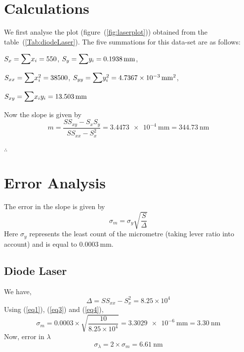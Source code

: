 \documentclass{article}
\begin{document}
\section{Calculations}
    We first analyse the plot (figure~(\ref{fig:laserplot})) obtained from the table~(\ref{Tab:diodeLaser}).
    The five summations for this data-set are as follows:
    \par
    \vspace{0.5cm}
    $S_{x} = \mathlarger{\mathlarger{\sum}} x_{i} = 550$, \hspace{1cm} $S_{y} = \mathlarger{\mathlarger{\sum}} y_{i} = \SI{0.1938}{\milli \metre}$,
    \par
    \vspace{0.5cm}
    $S_{xx} = \mathlarger{\mathlarger{\sum}} x_{i}^2 = 38500$, \hspace{1cm} $S_{yy} = \mathlarger{\mathlarger{\sum}} y_{i}^2 = \SI{4.7367e-3}{\milli \metre\squared}$,
    \par
    \vspace{0.5cm}
    $S_{xy} = \mathlarger{\mathlarger{\sum}} x_{i}y_{i} = \SI{13.503}{\milli \metre}$
    \par
    \vspace{0.5cm}
    \noindent
    Now the slope is given by
    \begin{equation}
    \label{eq1}
        m = \dfrac{S S_{xy} - S_{x}S_{y}}{S S_{xx} - S_{x}^2} = \SI{3.4473e-4}{\milli \metre} = \SI{344.73}{\nano \metre}
    \end{equation}
    \par
    \vspace{0.5cm}
    \noindent
    $\therefore$ 
    
\section{Error Analysis}
The error in the slope is given by 
\begin{equation}
\label{eq3}
    \sigma_m = \sigma_y \sqrt{\dfrac{S}{\Delta}}
\end{equation}
\noindent
Here $\sigma_y$ represents the least count of the micrometre (taking lever ratio into account) and is equal to $\SI{0.0003}{\milli\metre}$.
    \subsection{Diode Laser}
    We have,
    \begin{equation}
    \label{eq4}
        \Delta = S S_{xx} - S_{x}^2 = 8.25 \times 10^4
    \end{equation}
    Using (\ref{eq1}), (\ref{eq3}) and (\ref{eq4}),  
    \begin{equation}
    \label{eq5}
        \sigma_m = 0.0003 \times \sqrt{\dfrac{10}{8.25 \times 10^4}} = \SI{3.3029e-6}{\milli \metre} = \SI{3.30}{\nano \metre}
    \end{equation}
    Now, error in $\lambda$
    \begin{equation}
    \label{eq8}
        \boxed{\sigma_{\lambda} = 2 \times \sigma_{m} = \SI{6.61}{\nano \metre}}
    \end{equation}
\end{document}
